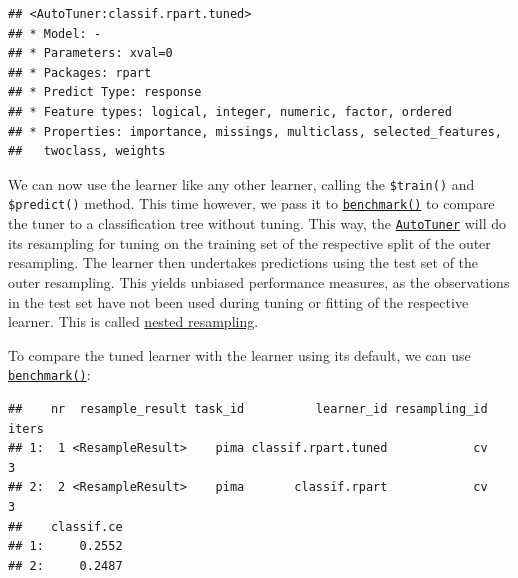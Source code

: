 \documentclass[]{scrbook}
\newenvironment{Shaded}{\begin{snugshade}}{\end{snugshade}}
\newcommand{\DataTypeTok}[1]{\textcolor[rgb]{0.13,0.29,0.53}{#1}}
\newcommand{\DecValTok}[1]{\textcolor[rgb]{0.00,0.00,0.81}{#1}}
\newcommand{\KeywordTok}[1]{\textcolor[rgb]{0.13,0.29,0.53}{\textbf{#1}}}
\newcommand{\NormalTok}[1]{#1}
\newcommand{\OperatorTok}[1]{\textcolor[rgb]{0.81,0.36,0.00}{\textbf{#1}}}
\newcommand{\StringTok}[1]{\textcolor[rgb]{0.31,0.60,0.02}{#1}}
\renewenvironment{Shaded} {\begin{snugshade}\small} {\end{snugshade}}
\begin{document}
\begin{verbatim}
## <AutoTuner:classif.rpart.tuned>
## * Model: -
## * Parameters: xval=0
## * Packages: rpart
## * Predict Type: response
## * Feature types: logical, integer, numeric, factor, ordered
## * Properties: importance, missings, multiclass, selected_features,
##   twoclass, weights
\end{verbatim}

We can now use the learner like any other learner, calling the \texttt{\$train()} and \texttt{\$predict()} method.
This time however, we pass it to \href{https://mlr3.mlr-org.com/reference/benchmark.html}{\texttt{benchmark()}} to compare the tuner to a classification tree without tuning.
This way, the \href{https://mlr3tuning.mlr-org.com/reference/AutoTuner.html}{\texttt{AutoTuner}} will do its resampling for tuning on the training set of the respective split of the outer resampling.
The learner then undertakes predictions using the test set of the outer resampling.
This yields unbiased performance measures, as the observations in the test set have not been used during tuning or fitting of the respective learner.
This is called \protect\hyperlink{nested-resampling}{nested resampling}.

To compare the tuned learner with the learner using its default, we can use \href{https://mlr3.mlr-org.com/reference/benchmark.html}{\texttt{benchmark()}}:

\begin{Shaded}
\end{Shaded}

\begin{verbatim}
##    nr  resample_result task_id          learner_id resampling_id iters
## 1:  1 <ResampleResult>    pima classif.rpart.tuned            cv     3
## 2:  2 <ResampleResult>    pima       classif.rpart            cv     3
##    classif.ce
## 1:     0.2552
## 2:     0.2487
\end{verbatim}
\end{document}
